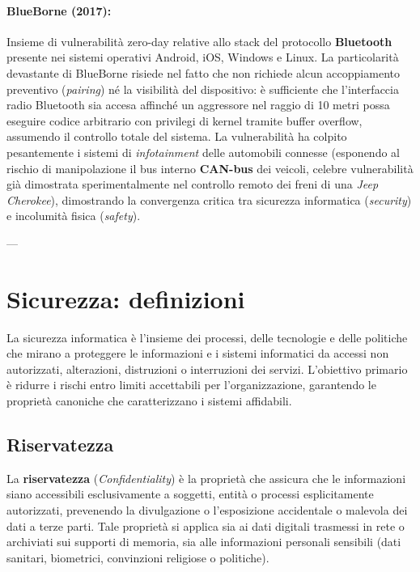 \documentclass[../../main.tex]{subfiles}
\begin{document}
\paragraph{BlueBorne (2017):}
Insieme di vulnerabilità zero-day relative allo stack del protocollo \textbf{Bluetooth} presente nei sistemi operativi Android, iOS, Windows e Linux. La particolarità devastante di BlueBorne risiede nel fatto che non richiede alcun accoppiamento preventivo (\textit{pairing}) né la visibilità del dispositivo: è sufficiente che l'interfaccia radio Bluetooth sia accesa affinché un aggressore nel raggio di 10 metri possa eseguire codice arbitrario con privilegi di kernel tramite buffer overflow, assumendo il controllo totale del sistema. La vulnerabilità ha colpito pesantemente i sistemi di \textit{infotainment} delle automobili connesse (esponendo al rischio di manipolazione il bus interno \textbf{CAN-bus} dei veicoli, celebre vulnerabilità già dimostrata sperimentalmente nel controllo remoto dei freni di una \textit{Jeep Cherokee}), dimostrando la convergenza critica tra sicurezza informatica (\textit{security}) e incolumità fisica (\textit{safety}).

---

\section{Sicurezza: definizioni}
\label{sec:sicurezza_definizioni}

La sicurezza informatica è l'insieme dei processi, delle tecnologie e delle politiche che mirano a proteggere le informazioni e i sistemi informatici da accessi non autorizzati, alterazioni, distruzioni o interruzioni dei servizi. L'obiettivo primario è ridurre i rischi entro limiti accettabili per l'organizzazione, garantendo le proprietà canoniche che caratterizzano i sistemi affidabili.

\subsection{Riservatezza}
\label{subsec:riservatezza}

La \textbf{riservatezza} (\textit{Confidentiality}) è la proprietà che assicura che le informazioni siano accessibili esclusivamente a soggetti, entità o processi esplicitamente autorizzati, prevenendo la divulgazione o l'esposizione accidentale o malevola dei dati a terze parti. Tale proprietà si applica sia ai dati digitali trasmessi in rete o archiviati sui supporti di memoria, sia alle informazioni personali sensibili (dati sanitari, biometrici, convinzioni religiose o politiche).
\end{document}
